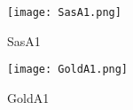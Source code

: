 \centering
\begin{sidewaysfigure}[h!]
	\centering
	\texttt{[image: SasA1.png]}
	\caption[]{SasA1}%
\end{sidewaysfigure}

\centering
\begin{sidewaysfigure}[h!]
	\centering
	\texttt{[image: GoldA1.png]}
	\caption[]{GoldA1}%
\end{sidewaysfigure}
